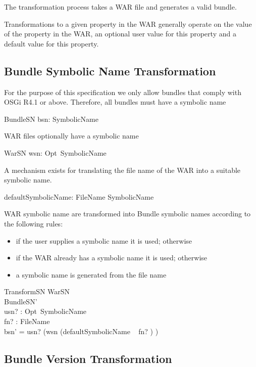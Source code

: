 \documentclass[a4paper,12pt]{article}
\begin{document}
The transformation process takes a WAR file and generates a valid bundle. 

Transformations to a given property in the WAR generally operate on the value of the property in the WAR, an optional user value for this property and a default value for this property. 

\subsection{Bundle Symbolic Name Transformation}

For the purpose of this specification we only allow bundles that comply with OSGi R4.1 or above. Therefore, all bundles must have a symbolic name

\begin{schema}{BundleSN}
bsn: SymbolicName
\end{schema}

WAR files optionally have a symbolic name

\begin{schema}{WarSN}
wsn: Opt~SymbolicName
\end{schema}

A mechanism exists for translating the file name of the WAR into a suitable symbolic name.

\begin{axdef}
defaultSymbolicName: FileName \fun SymbolicName
\end{axdef}

WAR symbolic  name are transformed into Bundle symbolic names according to the following rules:
\begin{itemize}
\item if the user supplies a symbolic name it is used; otherwise
\item if the WAR already has a symbolic name it is used; otherwise
\item a symbolic name is generated from the file name
\end{itemize}

\begin{schema}{TransformSN}
WarSN \\
BundleSN' \\
usn? : Opt~SymbolicName \\
fn? : FileName \\
\where
bsn' = usn?   (wsn   (defaultSymbolicName ~ fn? ) )
\end{schema}

\subsection{Bundle Version Transformation}
\end{document}
